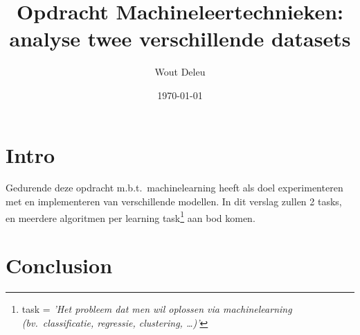 \documentclass[]{article}
\title{Opdracht Machineleertechnieken: analyse twee verschillende datasets}
\author{Wout Deleu}
\date{\today}
\begin{document}
\setlength{\parindent}{0pt} \maketitle \tableofcontents \newpage %

\section{Intro}
Gedurende deze opdracht m.b.t.\ machinelearning heeft als doel experimenteren
met en implementeren van verschillende modellen. In dit verslag zullen 2 tasks,
en meerdere algoritmen per learning task\footnote{task = \textit{'Het probleem
        dat men wil oplossen via machinelearning (bv.\ classificatie, regressie,
        clustering, \ldots)'}} aan bod komen.

\section{Conclusion}

\newpage


\end{document}
